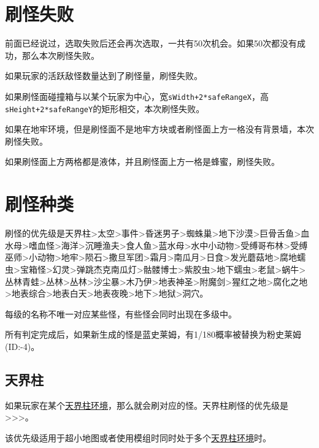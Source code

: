 \section{刷怪失败}
前面已经说过，选取失败后还会再次选取，一共有50次机会。如果50次都没有成功，那么本次刷怪失败。

如果玩家的活跃敌怪数量达到了刷怪量，刷怪失败。

如果刷怪面碰撞箱与以某个玩家为中心，宽\lstinline{sWidth+2*safeRangeX}，高\lstinline{sHeight+2*safeRangeY}的矩形相交，本次刷怪失败。

如果在地牢环境，但是刷怪面不是地牢方块或者刷怪面上方一格没有背景墙，本次刷怪失败。

如果刷怪面上方两格都是液体，并且刷怪面上方一格是蜂蜜，刷怪失败。

\section{刷怪种类}
刷怪的优先级是天界柱>太空>事件>昏迷男子>蜘蛛巢>地下沙漠>巨骨舌鱼>血水母>嗜血怪>海洋>沉睡渔夫>食人鱼>蓝水母>水中小动物>受缚哥布林>受缚巫师>小动物>地牢>陨石>撒旦军团>霜月>南瓜月>日食>发光蘑菇地>腐地蠕虫>宝箱怪>幻灵>弹跳杰克南瓜灯>骷髅博士>紫胶虫>地下蠕虫>老鼠>蜗牛>丛林青蛙>丛林>丛林>沙尘暴>木乃伊>地表神圣>附魔剑>猩红之地>腐化之地>地表综合>地表白天>地表夜晚>地下>地狱>洞穴。

每级的名称不唯一对应某些怪，有些怪会同时出现在多级中。

所有判定完成后，如果新生成的怪是蓝史莱姆，有1/180概率被替换为粉史莱姆(ID:-4)。

\subsection{天界柱}
如果玩家在某个\hyperref[app37]{天界柱环境}，那么就会刷对应的怪。天界柱刷怪的优先级是>>>。

\begin{remark}
该优先级适用于超小地图或者使用模组时同时处于多个\hyperref[app37]{天界柱环境}时。
\end{remark}

